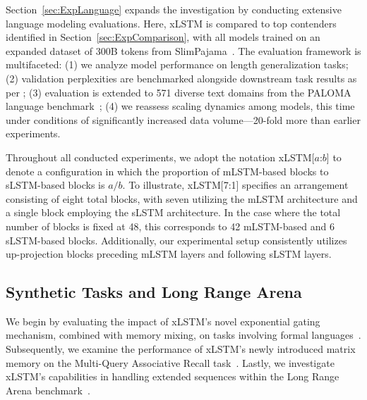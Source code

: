 Section~\ref{sec:ExpLanguage} expands the investigation by conducting extensive language modeling evaluations. Here, xLSTM is compared to top contenders identified in Section~\ref{sec:ExpComparison}, with all models trained on an expanded dataset of 300B tokens from SlimPajama~\citep{Soboleva:23}. The evaluation framework is multifaceted: (1) we analyze model performance on length generalization tasks; (2) validation perplexities are benchmarked alongside downstream task results as per \citet{Sutawika:24}; (3) evaluation is extended to 571 diverse text domains from the PALOMA language benchmark~\citep{Magnusson:23arxivshort}; (4) we reassess scaling dynamics among models, this time under conditions of significantly increased data volume—20-fold more than earlier experiments.

\label{sec:xlstm_blocks_notation}
Throughout all conducted experiments, we adopt the notation xLSTM[$a$:$b$] to denote a configuration in which the proportion of mLSTM-based blocks to sLSTM-based blocks is $a/b$. To illustrate, xLSTM[7:1] specifies an arrangement consisting of eight total blocks, with seven utilizing the mLSTM architecture and a single block employing the sLSTM architecture. In the case where the total number of blocks is fixed at 48, this corresponds to 42 mLSTM-based and 6 sLSTM-based blocks. Additionally, our experimental setup consistently utilizes up-projection blocks preceding mLSTM layers and following sLSTM layers.

\subsection{Synthetic Tasks and Long Range Arena}
\label{sec:ExpSyntethic}
We begin by evaluating the impact of xLSTM's novel exponential gating mechanism, combined with memory mixing, on tasks involving formal languages~\citep{Deletang:23}. Subsequently, we examine the performance of xLSTM's newly introduced matrix memory on the Multi-Query Associative Recall task~\citep{Arora:23arxiv}. Lastly, we investigate xLSTM's capabilities in handling extended sequences within the Long Range Arena benchmark~\citep{Tay:21}.

